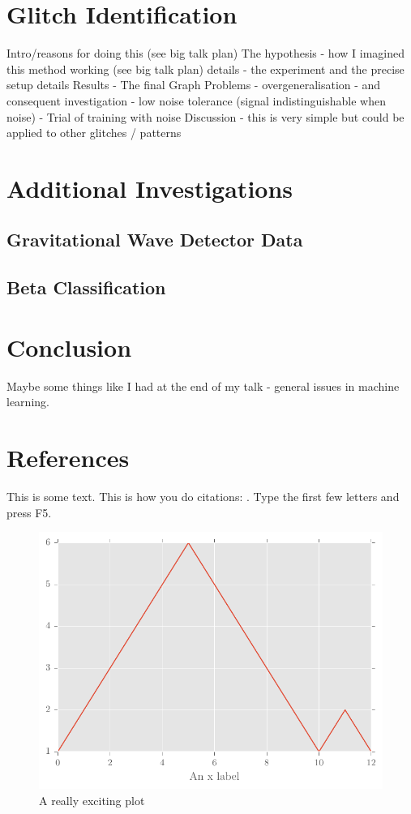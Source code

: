 \documentclass[a4paper]{jpconf}
\begin{document}
\section{Glitch Identification}
Intro/reasons for doing this (see big talk plan)
The hypothesis - how I imagined this method working (see big talk plan)
details - the experiment and the precise setup details
Results - The final Graph
Problems
 - overgeneralisation - and consequent investigation
 - low noise tolerance (signal indistinguishable when noise)
 - Trial of training with noise
Discussion - this is very simple but could be applied to other glitches / patterns

\section{Additional Investigations}
	\subsection{Gravitational Wave Detector Data}
	\subsection{Beta Classification}
	
\section{Conclusion}
	Maybe some things like I had at the end of my talk - general issues in machine learning.
	
\section*{References} 

This is some text. This is how you do citations: \cite{}. Type the first few letters and press F5.
\begin{center}
    \begin{figure}
            \includegraphics[width=\textwidth]{testMatplotlibPlot.pdf}
            \caption{A really exciting plot}
    \end{figure}
\end{center}
\end{document}
